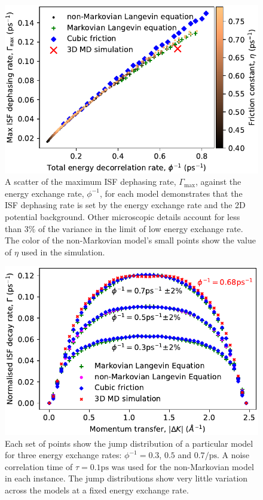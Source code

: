 \documentclass[7pt]{article}
\newcommand{\ps}{\si{\pico\second}}
\newcommand{\ips}{\si{\per\pico\second}}
\begin{document}
\begin{figure}
	\centering
	\includegraphics[width=1.0\columnwidth]{gamma_ttf}
	\caption{A scatter of the maximum ISF dephasing rate, $\Gamma_{\text{max}}$, against the energy exchange rate, $\phi^{-1}$, for each model demonstrates that the ISF dephasing rate is set by the energy exchange rate and the 2D potential background. Other microscopic details account for less than $3\%$ of the variance in the limit of low energy exchange rate. The color of the non-Markovian model's small points show the value of $\eta$ used in the simulation.}
	\label{fig:gamma_ttf}
\end{figure}

\begin{figure}
	\centering
	\includegraphics[width=1.0\columnwidth]{jump_distribution}
	\caption{Each set of points show the jump distribution of a particular model for three energy exchange rates: $\phi^{-1}=0.3$, $0.5$ and $0.7\ips$. A noise correlation time of $\tau=0.1\ps$ was used for the non-Markovian model in each instance. The jump distributions show very little variation across the models at a fixed energy exchange rate.} 
	\label{fig:jump_distribution}
\end{figure}
\end{document}
